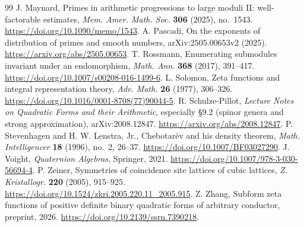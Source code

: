 \documentclass[11pt]{article}
\theoremstyle{remark}\newtheorem{remark}[theorem]{Remark}
\begin{document}
\begin{thebibliography}{99}
 J. Maynard, Primes in arithmetic progressions to large moduli II: well-factorable estimates, \emph{Mem. Amer. Math. Soc.} \textbf{306} (2025), no.~1543. \url{https://doi.org/10.1090/memo/1543}.
 A. Pascadi, On the exponents of distribution of primes and smooth numbers, arXiv:2505.00653v2 (2025). \url{https://arxiv.org/abs/2505.00653}.
 T. Rossmann, Enumerating submodules invariant under an endomorphism, \emph{Math. Ann.} \textbf{368} (2017), 391--417. \url{https://doi.org/10.1007/s00208-016-1499-6}.
 L. Solomon, Zeta functions and integral representation theory, \emph{Adv. Math.} \textbf{26} (1977), 306--326. \url{https://doi.org/10.1016/0001-8708(77)90044-5}.
 R. Schulze-Pillot, \emph{Lecture Notes on Quadratic Forms and their Arithmetic}, especially \S9.2 (spinor genera and strong approximation), arXiv:2008.12847. \url{https://arxiv.org/abs/2008.12847}.
 P. Stevenhagen and H. W. Lenstra, Jr., Chebotar\"ev and his density theorem, \emph{Math. Intelligencer} \textbf{18} (1996), no.~2, 26--37. \url{https://doi.org/10.1007/BF03027290}.
 J. Voight, \emph{Quaternion Algebras}, Springer, 2021. \url{https://doi.org/10.1007/978-3-030-56694-4}.
 P. Zeiner, Symmetries of coincidence site lattices of cubic lattices, \emph{Z. Kristallogr.} \textbf{220} (2005), 915--925. \url{https://doi.org/10.1524/zkri.2005.220.11_2005.915}.
 Z. Zhang, Subform zeta functions of positive definite binary quadratic forms of arbitrary conductor, preprint, 2026. \url{https://doi.org/10.2139/ssrn.7390218}.
\end{thebibliography}
\end{document}
